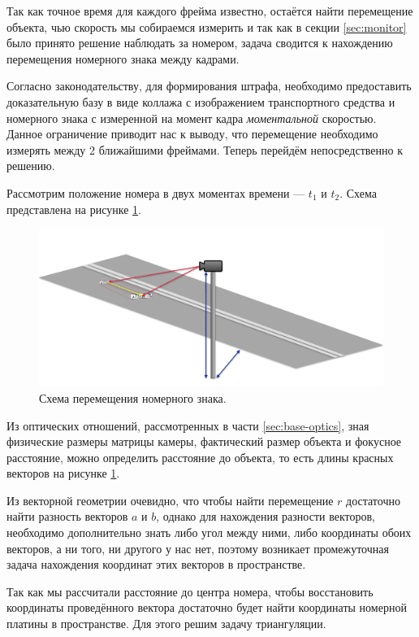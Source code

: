 \documentclass[specification,annotation,times]{itmo-student-thesis}
\begin{document}
Так как точное время для каждого фрейма известно, остаётся найти перемещение объекта, чью скорость мы собираемся измерить и так как в секции \ref{sec:monitor} было принято решение наблюдать за номером, задача сводится к нахождению перемещения номерного знака между кадрами.

Согласно законодательству, для формирования штрафа, необходимо предоставить доказательную базу в виде коллажа с изображением транспортного средства и номерного знака с измеренной на момент кадра \textit{моментальной} скоростью. Данное ограничение приводит нас к выводу, что перемещение необходимо измерять между 2 ближайшими фреймами. Теперь перейдём непосредственно к решению.

Рассмотрим положение номера в двух моментах времени --- $ t_1 $ и $ t_2 $. Схема представлена на рисунке \ref{img:r-scheme}.

\begin{figure}[!ht]
	\caption{Схема перемещения номерного знака.}\label{img:r-scheme}
	\includegraphics[width=0.85\linewidth]{../png/r_scheme.png}
	\centering
\end{figure}

Из оптических отношений, рассмотренных в части \ref{sec:base-optics}, зная физические размеры матрицы камеры, фактический размер объекта и фокусное расстояние, можно определить расстояние до объекта, то есть длины красных векторов на рисунке \ref{img:r-scheme}.

Из векторной геометрии очевидно, что чтобы найти перемещение $r$ достаточно найти разность векторов $a$ и $b$, однако для нахождения разности векторов, необходимо дополнительно знать либо угол между ними, либо координаты обоих векторов, а ни того, ни другого у нас нет, поэтому возникает промежуточная задача нахождения координат этих векторов в пространстве.

Так как мы рассчитали расстояние до центра номера, чтобы восстановить координаты проведённого вектора достаточно будет найти координаты номерной платины в пространстве. Для этого решим задачу триангуляции.
\end{document}
